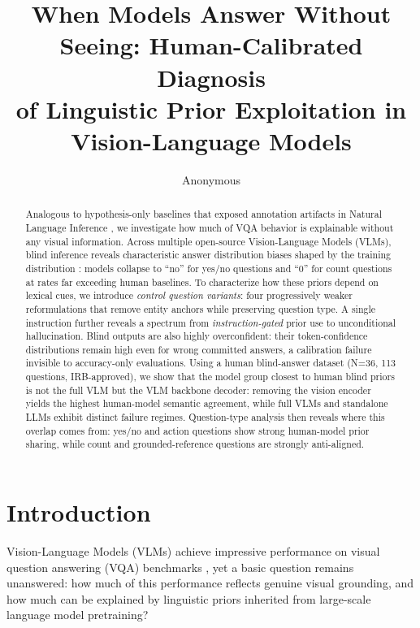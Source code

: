 \documentclass[letterpaper]{article}
\title{When Models Answer Without Seeing: Human-Calibrated Diagnosis\\
of Linguistic Prior Exploitation in Vision-Language Models}
\author{Anonymous}
\begin{document}
\maketitle

\begin{abstract}
Analogous to hypothesis-only baselines that exposed annotation artifacts in
Natural Language Inference \citep{poliak2018hypothesis}, we investigate how
much of VQA behavior is explainable without any visual information.
Across multiple open-source Vision-Language Models (VLMs), blind inference
reveals characteristic answer distribution biases shaped by the training
distribution \citep{mccoy2024embers}: models collapse to ``no'' for yes/no
questions and ``0'' for count questions at rates far exceeding human baselines.
To characterize how these priors depend on lexical cues, we introduce
\emph{control question variants}: four progressively weaker reformulations that
remove entity anchors while preserving question type. A single instruction
further reveals a spectrum from \emph{instruction-gated} prior use to
unconditional hallucination. Blind outputs are also highly overconfident:
their token-confidence distributions remain high even for wrong committed
answers, a calibration failure
invisible to accuracy-only evaluations. Using a human blind-answer dataset
(N=36, 113 questions, IRB-approved), we show that the model group closest to
human blind priors is not the full VLM but the VLM backbone decoder: removing
the vision encoder yields the highest human-model semantic agreement, while
full VLMs and standalone LLMs exhibit distinct failure regimes. Question-type
analysis then reveals where this overlap comes from: yes/no and action
questions show strong human-model prior sharing, while count and
grounded-reference questions are strongly anti-aligned.
\end{abstract}

\section{Introduction}

Vision-Language Models (VLMs) achieve impressive performance on visual question
answering (VQA) benchmarks \citep{antol2015vqa,goyal2016making}, yet a basic
question remains unanswered: how much of this performance reflects genuine
visual grounding, and how much can be explained by linguistic priors inherited
from large-scale language model pretraining?
\end{document}
